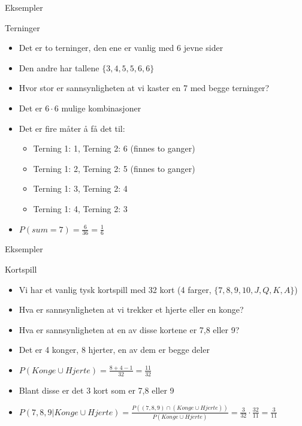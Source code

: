 \begin{frame}{Eksempler}
\begin{block}{Terninger}
\begin{itemize}[<+->]
\item Det er to terninger, den ene er vanlig med 6 jevne sider
\item Den andre har tallene $\{3,4,5,5,6,6\}$
\item Hvor stor er sannsynligheten at vi kaster en 7 med begge terninger?
\item Det er $6\cdot 6$ mulige kombinasjoner
\item Det er fire måter å få det til:
\begin{itemize}
\item Terning 1: 1, Terning 2: 6 (finnes to ganger)
\item Terning 1: 2, Terning 2: 5 (finnes to ganger)
\item Terning 1: 3, Terning 2: 4
\item Terning 1: 4, Terning 2: 3
\end{itemize}
\item $P(sum=7)=\frac{6}{36}=\frac{1}{6}$
\end{itemize}
\end{block}
\end{frame}

\begin{frame}{Eksempler}
\begin{block}{Kortspill}
\begin{itemize}[<+->]
\item Vi har et vanlig tysk kortspill med 32 kort (4 farger, $\{7,8,9,10,J,Q,K,A\}$)
\item Hva er sannsynligheten at vi trekker et hjerte eller en konge?
\item Hva er sannsynligheten at en av disse kortene er 7,8 eller 9?
\item Det er 4 konger, 8 hjerter, en av dem er begge deler
\item $P(Konge\cup Hjerte)=\frac{8+4-1}{32}=\frac{11}{32}$
\item Blant disse er det 3 kort som er 7,8 eller 9
\item $P(7,8,9|Konge\cup Hjerte)=\frac{P((7,8,9)\cap(Konge\cup Hjerte))}{P(Konge\cup Hjerte)}=\frac{3}{32}\cdot \frac{32}{11}=\frac{3}{11}$
\end{itemize}
\end{block}
\end{frame}

